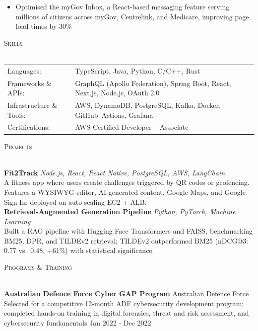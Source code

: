 \documentclass[a4paper]{article}
\newcommand{\lineunder}{
    \vspace*{-8pt} \\
    \hspace*{-18pt} \hrulefill \\
    \vspace*{-4pt}
}
\newcommand{\header}[1]{
    {\hspace*{-18pt}\vspace*{3pt} \textsc{#1}}
    \vspace*{-3pt} \lineunder
}
\begin{document}
\vspace{-2mm}
\begin{itemize} \itemsep -1pt
    \item Optimised the myGov Inbox, a React-based messaging feature serving millions of citizens across myGov, Centrelink, and Medicare, improving page load times by 30\%
\end{itemize}
\vspace{-2mm}
\header{Skills}
\vspace{1.5mm}
\begin{tabular}{ l p{6.7in} }
    Languages:                  & TypeScript, Java, Python, C/C++, Rust \\
    Frameworks \& APIs:        & GraphQL (Apollo Federation), Spring Boot, React, Next.js, Node.js, OAuth 2.0 \\
    Infrastructure \& Tools:   & AWS, DynamoDB, PostgreSQL, Kafka, Docker, \mbox{GitHub Actions}, Grafana \\
    Certifications:            & AWS Certified Developer -- Associate \\
\end{tabular}

\vspace{1.5mm}
\header{Projects}
{\textbf{Fit2Track}} {\sl Node.js, React, React Native, PostgreSQL, AWS, LangChain}\\
A fitness app where users create challenges triggered by QR codes or geofencing. Features a WYSIWYG editor, AI-generated content, Google Maps, and Google Sign-In; deployed on auto-scaling EC2 + ALB.\\
\vspace*{1mm}
{\textbf{Retrieval-Augmented Generation Pipeline}} {\sl Python, PyTorch, Machine Learning} \\
Built a RAG pipeline with Hugging Face Transformers and FAISS, benchmarking BM25, DPR, and TILDEv2 retrieval; TILDEv2 outperformed BM25 (nDCG@3: 0.77 vs.\ 0.48, +61\%) with statistical significance.\\
\vspace*{1mm}

\header{Programs \& Training}
\textbf{Australian Defence Force Cyber GAP Program} \hfill Australian Defence Force\\
Selected for a competitive 12-month ADF cybersecurity development program; completed hands-on training in digital forensics, threat and risk assessment, and cybersecurity fundamentals \hfill Jan 2022 - Dec 2022\\
\end{document}
